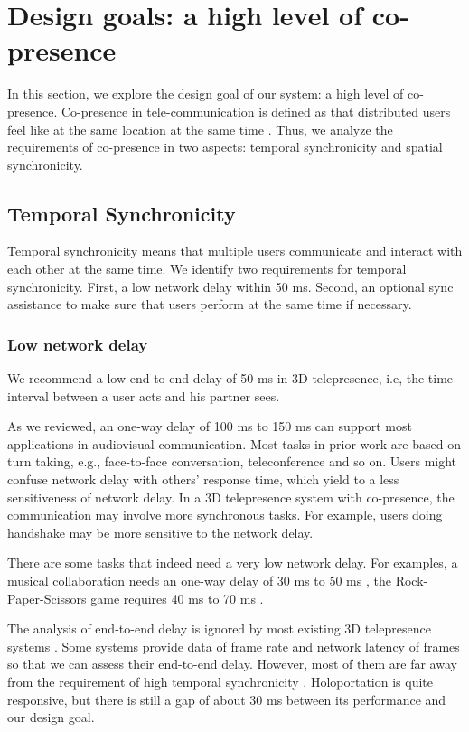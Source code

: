 \section{Design goals: a high level of co-presence}

In this section, we explore the design goal of our system: a high level of co-presence. Co-presence in tele-communication is defined as that distributed users feel like at the same location at the same time \cite{kraut2002use}. Thus, we analyze the requirements of co-presence in two aspects: temporal synchronicity and spatial synchronicity.

\subsection{Temporal Synchronicity}

Temporal synchronicity means that multiple users communicate and interact with each other at the same time. We identify two requirements for temporal synchronicity. First, a low network delay within 50 ms. Second, an optional sync assistance to make sure that users perform at the same time if necessary.

\subsubsection{Low network delay}

We recommend a low end-to-end delay of 50 ms in 3D telepresence, i.e, the time interval between a user acts and his partner sees.

As we reviewed, an one-way delay of 100 ms to 150 ms can support most applications in audiovisual communication. Most tasks in prior work are based on turn taking, e.g., face-to-face conversation, teleconference and so on. Users might confuse network delay with others' response time, which yield to a less sensitiveness of network delay. In a 3D telepresence system with co-presence, the communication may involve more synchronous tasks. For example, users doing handshake may be more sensitive to the network delay.

There are some tasks that indeed need a very low network delay. For examples, a musical collaboration needs an one-way delay of 30 ms to 50 ms \cite{schuett2002effects}, the Rock-Paper-Scissors game requires 40 ms to 70 ms \cite{hashimoto2006influences}.

The analysis of end-to-end delay is ignored by most existing 3D telepresence systems \cite{maimone2011encumbrance, kurillo2008immersive, petit2010multicamera, pejsa2016room2room}. Some systems provide data of frame rate and network latency of frames so that we can assess their end-to-end delay. However, most of them are far away from the requirement of high temporal synchronicity \cite{gross2003blue, beck2013immersive, gibbs1999teleport}. Holoportation \cite{orts2016holoportation} is quite responsive, but there is still a gap of about 30 ms between its performance and our design goal.

